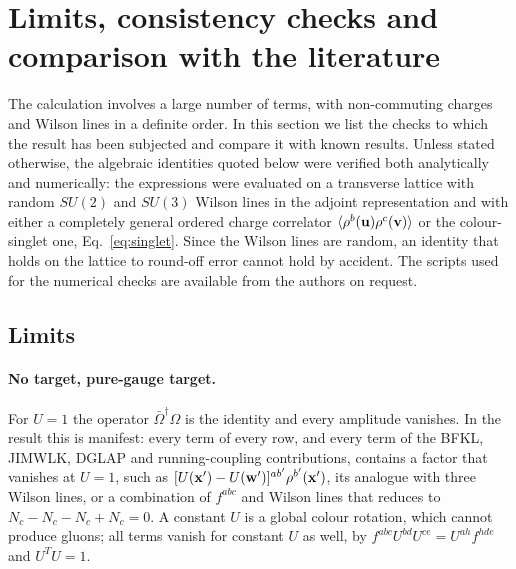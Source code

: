 \section{Limits, consistency checks and comparison with the literature}\label{sec:checks}

The calculation involves a large number of terms, with non-commuting charges and Wilson lines in a definite order. In this section we list the checks to which the result has been subjected and compare it with known results. Unless stated otherwise, the algebraic identities quoted below were verified both analytically and numerically: the expressions were evaluated on a transverse lattice with random $SU(2)$ and $SU(3)$ Wilson lines in the adjoint representation and with either a completely general ordered charge correlator $\langle\rho^b(\mathbf{u})\rho^c(\mathbf{v})\rangle$ or the colour-singlet one, Eq.~\eqref{eq:singlet}. Since the Wilson lines are random, an identity that holds on the lattice to round-off error cannot hold by accident. The scripts used for the numerical checks are available from the authors on request.

\subsection{Limits}\label{sec:limits}

\paragraph{No target, pure-gauge target.} For $U=1$ the operator $\bar\Omega^\dagger\Omega$ is the identity and every amplitude vanishes. In the result this is manifest: every term of every row, and every term of the BFKL, JIMWLK, DGLAP and running-coupling contributions, contains a factor that vanishes at $U=1$, such as $[U(\mathbf{x}')-U(\mathbf{w}')]^{ab'}\rho^{b'}(\mathbf{x}')$, its analogue with three Wilson lines, or a combination of $f^{abc}$ and Wilson lines that reduces to $N_c-N_c-N_c+N_c=0$. A constant $U$ is a global colour rotation, which cannot produce gluons; all terms vanish for constant $U$ as well, by $f^{abc}U^{bd}U^{ce}=U^{ah}f^{hde}$ and $U^TU=1$.

